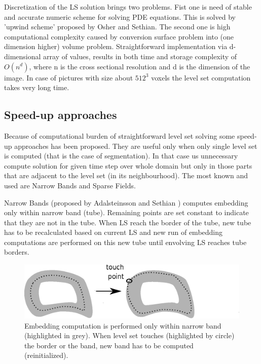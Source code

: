 Discretization of the LS solution brings two problems.
Fist one is need of stable and accurate numeric scheme for solving PDE equations.
This is solved by 'upwind scheme' proposed by Osher and Sethian\cite{sethianLS}.
The second one is high computational complexity caused by conversion surface problem into (one dimension higher) volume problem.
Straightforward implementation via d-dimensional array of values, results in both time and storage complexity of $O(n^d)$, where n is the cross sectional resolution and d is the dimension of the image.
In case of pictures with size about $512^3$ voxels the level set computation takes very long time.

\subsection{Speed-up approaches}

Because of computational burden of straightforward level set solving some speed-up approaches has been proposed.
They are useful only when only single level set is computed (that is the case of segmentation).
In that case us unnecessary compute solution for given time step over whole domain but only in those parts that are adjacent to the level set (in its neighbourhood).
The most known and used are Narrow Bands and Sparse Fields.

Narrow Bands (proposed by Adalsteinsson and Sethian \cite{sethianFastLS}) computes embedding only within narrow band (tube).
Remaining points are set constant to indicate that they are not in the tube.
When LS reach the border of the tube, new tube has to be recalculated based on current LS and new run of embedding computations are performed on this new tube until envolving LS reaches tube borders.

\begin{figure}
    \centering
    \includegraphics[width=\textwidth]{data/narrowBands}
    \caption[Narrow bands computation illustration]{Embedding computation is performed only within narrow band (highlighted in grey). When level set touches (highlighted by circle) the border or the band, new band has to be computed (reinitialized).}
    \label{fg:narrowBands}
\end{figure}

